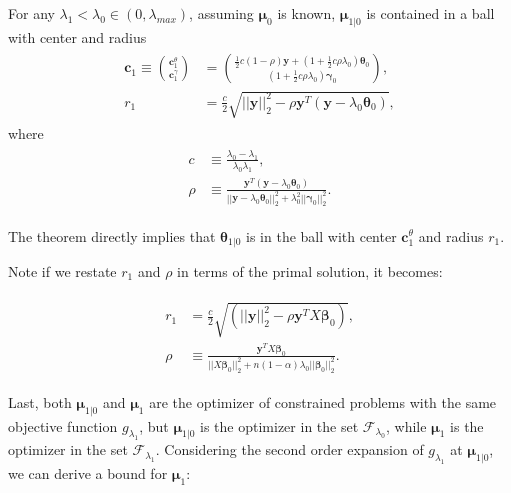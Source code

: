 \begin{theorem}
    \label{thm:1.1.alt}
    For any $\lambda_1<\lambda_{0}\in (0,\lambda_{max})$, assuming $\boldsymbol\mu_0$ is known, $\boldsymbol\mu_{1|0}$ is contained in a ball with center and radius
    \begin{gather}
        \begin{aligned}
            \boldsymbol c_1\equiv\binom{\boldsymbol c_1^\theta}{\boldsymbol c_1^\gamma}&=\binom{\frac{1}{2}c(1-\rho)\boldsymbol y+(1+\frac{1}{2}c\rho\lambda_0)\boldsymbol\theta_{0}}{(1+\frac{1}{2}c\rho\lambda_0)\boldsymbol\gamma_{0}},\\
            r_1&=\frac{c}{2}\sqrt{||\boldsymbol y||_2^2-\rho \boldsymbol y^T(\boldsymbol y-\lambda_0\boldsymbol\theta_{0})},
        \end{aligned}
    \end{gather}
    where
    \begin{gather}
        \begin{aligned}
            c&\equiv\frac{\lambda_0-\lambda_1}{\lambda_0\lambda_1},\\
            \rho&\equiv\frac{\boldsymbol y^T(\boldsymbol y-\lambda_0\boldsymbol\theta_{0})}{||\boldsymbol y-\lambda_0\boldsymbol\theta_{0}||_2^2+\lambda_0^2||\boldsymbol\gamma_{0}||_2^2}.\nonumber
        \end{aligned}
    \end{gather}
\end{theorem}

The theorem  directly implies that $\boldsymbol\theta_{1|0}$ is in the ball with center $\boldsymbol c_1^\theta$ and radius $r_1$.

Note if we restate $r_1$ and $\rho$ in terms of the primal solution, it becomes:

\begin{gather}
    \label{eq:thm1prim}
    \begin{aligned}
        r_1&=\frac{c}{2}\sqrt{(||\boldsymbol y||_2^2-\rho \boldsymbol y^TX\boldsymbol\beta_{0})},\\
        \rho&\equiv\frac{\boldsymbol y^TX\boldsymbol\beta_{0}}{||X\boldsymbol\beta_{0}||_2^2+n(1-\alpha)\lambda_0||\boldsymbol\beta_{0}||_2^2}.
    \end{aligned}
\end{gather}

Last, both $\boldsymbol\mu_{1|0}$ and $\boldsymbol\mu_1$ are the optimizer of constrained problems with the same objective function $g_{\lambda_1}$, but $\boldsymbol\mu_{1|0}$ is the optimizer in the set $\mathcal{F}_{\lambda_0}$, while $\boldsymbol\mu_1$ is the optimizer in the set $\mathcal{F}_{\lambda_1}$. Considering the second order expansion of $g_{\lambda_1}$ at $\boldsymbol\mu_{1|0}$, we can derive a bound for $\boldsymbol\mu_1$:

